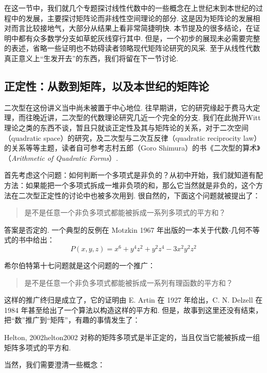 在这一节中，我们就几个专题探讨线性代数中的一些概念在上世纪末到本世纪的过程中的发展，主要探讨矩阵论而非线性空间理论的部分. 这是因为矩阵论的发展相对而言比较接地气，大部分从结果上看非常简捷明快. 本节提及的很多结论，在证明中都有众多数学分支如草蛇灰线穿行其中. 但是，一个初步的展现未必需要完整的表述，省略一些证明也不妨碍读者领略现代矩阵论研究的风采. 至于从线性代数真正意义上``生发开去''的东西，我们将留在下一节讨论.

\subsection{正定性：从数到矩阵，以及本世纪的矩阵论}

二次型在这份讲义当中尚未被置于中心地位. 往早期讲，它的研究缘起于费马大定理，而往晚近讲，二次型的代数理论研究几近一个完全的分支. 我们在此抛开Witt理论之类的东西不谈，暂且只就谈正定性及其与矩阵论的关系，对于二次空间（quadratic space）的研究，及二次型与二次互反律（quadratic reciprocity law）的关系等等主题，读者自可参考志村五郎（Goro Shimura）的书《二次型的算术》（\textit{Arithmetic of Quadratic Forms}）.

首先考虑这个问题：如何判断一个多项式是非负的？从初中开始，我们就知道有配方法：如果能把一个多项式拆成一堆非负项的和，那么它当然就是非负的，这个方法在二次型正定性的讨论中也被多次用到. 很自然的，下面这个问题就被提出了：

\begin{quote}
    \kaishu
    是不是任意一个非负多项式都能被拆成一系列多项式的平方和？
\end{quote}

答案是否定的. 一个典型的反例在 Motzkin 1967 年出版的一本关于代数-几何不等式的书中给出：
\[ P(x, y, z) = x^6 + y^4z^2 + y^2z^4 -3x^2y^2z^2 \]

希尔伯特第十七问题就是这个问题的一个推广：
\begin{quote}
    \kaishu
    是不是任意一个非负多项式都能被拆成一系列有理函数的平方和？
\end{quote}

这样的推广终归是成立了，它的证明由 E. Artin 在 1927 年给出，C. N. Delzell 在 1984 年甚至给出了一个算法以构造这样的平方和. 但是，故事到这里还没有结束，把``数''推广到``矩阵''，有趣的事情发生了：

\begin{theorem}{Helton, 2002}{helton2002}
    对称的矩阵多项式是半正定的，当且仅当它能被拆成一组矩阵多项式的平方和.
\end{theorem}

当然，我们需要澄清一些概念：

